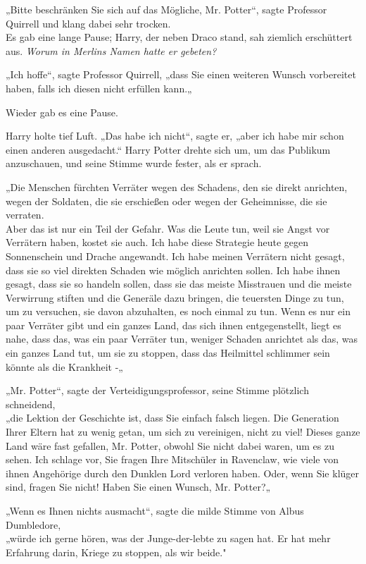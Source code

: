{„Bitte beschränken Sie sich auf das Mögliche, Mr. Potter“, sagte Professor Quirrell und klang dabei sehr trocken.\\ Es gab eine lange Pause; Harry, der neben Draco stand, sah ziemlich erschüttert aus. \emph{Worum in Merlins Namen hatte er gebeten?}

„Ich hoffe“, sagte Professor Quirrell, „dass Sie einen weiteren Wunsch vorbereitet haben, falls ich diesen nicht erfüllen kann.„

Wieder gab es eine Pause.

Harry holte tief Luft. „Das habe ich nicht“, sagte er, „aber ich habe mir schon einen anderen ausgedacht.“ Harry Potter drehte sich um, um das Publikum anzuschauen, und seine Stimme wurde fester, als er sprach.

„Die Menschen fürchten Verräter wegen des Schadens, den sie direkt anrichten, wegen der Soldaten, die sie erschießen oder wegen der Geheimnisse, die sie verraten.\\ Aber das ist nur ein Teil der Gefahr. Was die Leute tun, weil sie Angst vor Verrätern haben, kostet sie auch. Ich habe diese Strategie heute gegen Sonnenschein und Drache angewandt. Ich habe meinen Verrätern nicht gesagt, dass sie so viel direkten Schaden wie möglich anrichten sollen. Ich habe ihnen gesagt, dass sie so handeln sollen, dass sie das meiste Misstrauen und die meiste Verwirrung stiften und die Generäle dazu bringen, die teuersten Dinge zu tun, um zu versuchen, sie davon abzuhalten, es noch einmal zu tun. Wenn es nur ein paar Verräter gibt und ein ganzes Land, das sich ihnen entgegenstellt, liegt es nahe, dass das, was ein paar Verräter tun, weniger Schaden anrichtet als das, was ein ganzes Land tut, um sie zu stoppen, dass das Heilmittel schlimmer sein könnte als die Krankheit -„

„Mr. Potter“, sagte der Verteidigungsprofessor, seine Stimme plötzlich schneidend,\\ „die Lektion der Geschichte ist, dass Sie einfach falsch liegen. Die Generation Ihrer Eltern hat zu wenig getan, um sich zu vereinigen, nicht zu viel! Dieses ganze Land wäre fast gefallen, Mr. Potter, obwohl Sie nicht dabei waren, um es zu sehen. Ich schlage vor, Sie fragen Ihre Mitschüler in Ravenclaw, wie viele von ihnen Angehörige durch den Dunklen Lord verloren haben. Oder, wenn Sie klüger sind, fragen Sie nicht! Haben Sie einen Wunsch, Mr. Potter?„

„Wenn es Ihnen nichts ausmacht“, sagte die milde Stimme von Albus Dumbledore,\\ „würde ich gerne hören, was der Junge-der-lebte zu sagen hat. Er hat mehr Erfahrung darin, Kriege zu stoppen, als wir beide."

}

